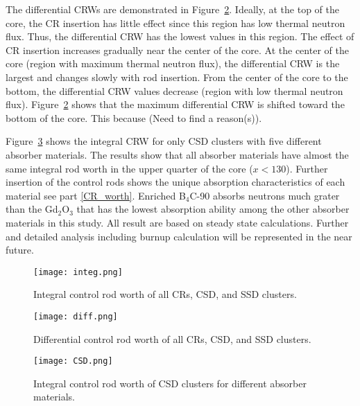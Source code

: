The differential CRWs are demonstrated in Figure~\ref{fig:diff}. Ideally, at the top of the core, the CR insertion has little effect since this region has low thermal neutron flux. Thus, the differential CRW has the lowest values in this region. The effect of CR insertion increases gradually near the center of the core. At the center of the core (region with maximum thermal neutron flux), the differential CRW is the largest and changes slowly with rod insertion. From the center of the core to the bottom, the differential CRW values decrease (region with low thermal neutron flux). Figure~\ref{fig:diff} shows that the maximum differential CRW  is shifted toward the bottom of the core. This because (Need to find a reason(s)).

Figure~\ref{fig:CSD} shows the integral CRW for only CSD clusters with five different absorber materials. The results show that all absorber materials have almost the same integral rod worth in the upper quarter of the core ($x$$<$$130$). Further insertion of the control rods shows the unique absorption characteristics of each material see part \ref{CR_worth}. Enriched B$_4$C-90 absorbs neutrons much grater than the Gd$_2$O$_3$ that has the lowest absorption ability among the other absorber materials in this study. All result are based on steady state calculations. Further and detailed analysis including burnup calculation will be represented in the near future.

\begin{figure}
	\centering
	\texttt{[image: integ.png]}
	\vspace{-0.5in}
	\caption{Integral control rod worth of all CRs, CSD, and SSD clusters.} 
	\label{fig:integ}
\end{figure}

\begin{figure}
	\centering
	\texttt{[image: diff.png]}
	\vspace{-0.5in}
	\caption{Differential control rod worth of all CRs, CSD, and SSD clusters.} 
	\label{fig:diff}
\end{figure}

\begin{figure}
	\centering
	\texttt{[image: CSD.png]}
	\vspace{-0.5in}
	\caption{Integral control rod worth of CSD clusters for different absorber materials.} 
	\label{fig:CSD}
\end{figure}